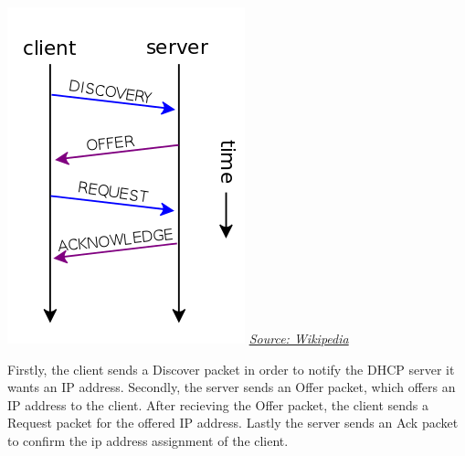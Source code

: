 \includegraphics[scale=0.5]{images/dhcp.png}
\newline
\href{https://en.wikipedia.org/wiki/File:DHCP_session.svg}{\color{red}\textit{Source: Wikipedia}}

Firstly, the client sends a Discover packet in order to notify the DHCP server it wants an IP address. Secondly, the server sends an Offer packet, which offers an IP address to the client. After recieving the Offer packet, the client sends a Request packet for the offered IP address. Lastly the server sends an Ack packet to confirm the ip address assignment of the client.
